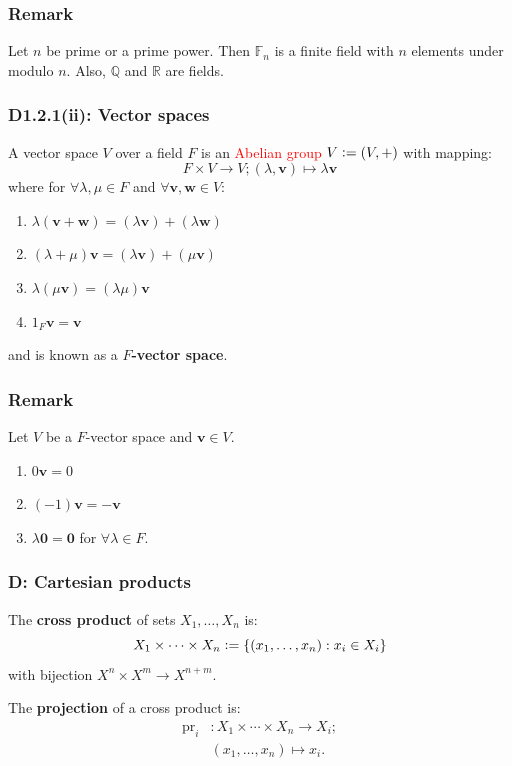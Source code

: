 \documentclass{article}
\newcommand{\deq}{\vcentcolon=}
\newcommand{\vc}[1]{\boldsymbol{#1}}
\begin{document}
\begin{multicols*}{3}
\subsubsection*{Remark}
Let $n$ be prime or a prime power.
Then $\mathbb{F}_n$ is a finite field with $n$ elements
under modulo $n$.
Also, $\mathbb{Q}$ and $\mathbb{R}$ are fields.

\subsubsection*{D1.2.1(ii): Vector spaces}
A vector space $V$ over a field $F$ is an 
\textcolor{red}{Abelian group} $V\deq(V,+)$ with mapping:
$$F\times V\rightarrow V;
(\lambda,\vc{v})\mapsto
\lambda\vc{v}$$
where for $\forall\lambda, \mu\in F$ and
$\forall\vc{v},\vc{w}\in V$:
\begin{enumerate}
    \item
    $\lambda(\vc{v}+\vc{w})
    =(\lambda\vc{v})+(\lambda\vc{w})$

    \item $(\lambda+\mu)\vc{v}
    =(\lambda\vc{v})+(\mu\vc{v})$

    \item $\lambda(\mu\vc{v})=(\lambda\mu)\vc{v}$
    
    \item $1_F\vc{v}=\vc{v}$
\end{enumerate}
and is known as a \textbf{$F$-vector space}.

\subsubsection*{Remark}
Let $V$ be a $F$-vector space and $\vc{v}\in V$.
\begin{enumerate}
    \item $0\vc{v}=0$
    \item $(-1)\vc{v}=-\vc{v}$
    \item $\lambda\vc{0}=\vc{0}$
    for $\forall\lambda\in F$.
\end{enumerate}

\subsubsection*{D: Cartesian products}
The \textbf{cross product} of sets $X_1,\dots,X_n$ is:
$$X_1\times\cdots\times X_n
\deq\{(x_1,\dots,x_n):x_i\in X_i\}$$
with bijection $X^n\times X^m\rightarrow X^{n+m}$.

The \textbf{projection} of a cross product is:
\begin{align*}
    \text{pr}_i &:X_1\times\cdots\times X_n
    \rightarrow X_i; \\
    &(x_1,\dots,x_n)\mapsto x_i.
\end{align*}


\end{multicols*}
\end{document}
